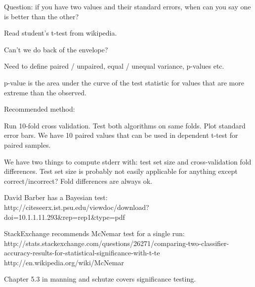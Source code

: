 Question: if you have two values and their standard errors, when can
you say one is better than the other?

Read student's t-test from wikipedia.

Can't we do back of the envelope?

Need to define paired / unpaired, equal / unequal variance, p-values
etc.

p-value is the area under the curve of the test statistic for values
that are more extreme than the observed.

Recommended method:

Run 10-fold cross validation.
Test both algorithms on same folds.
Plot standard error bars.
We have 10 paired values that can be used in dependent t-test for
paired samples.

We have two things to compute stderr with: test set size and
cross-validation fold differences.  Test set size is probably not
easily applicable for anything except correct/incorrect?  Fold
differences are always ok.

David Barber has a Bayesian test:
http://citeseerx.ist.psu.edu/viewdoc/download?doi=10.1.1.11.293&rep=rep1&type=pdf

StackExchange recommends McNemar test for a single run:
http://stats.stackexchange.com/questions/26271/comparing-two-classifier-accuracy-results-for-statistical-significance-with-t-te
http://en.wikipedia.org/wiki/McNemar%

Chapter 5.3 in manning and schutze covers significance testing.
